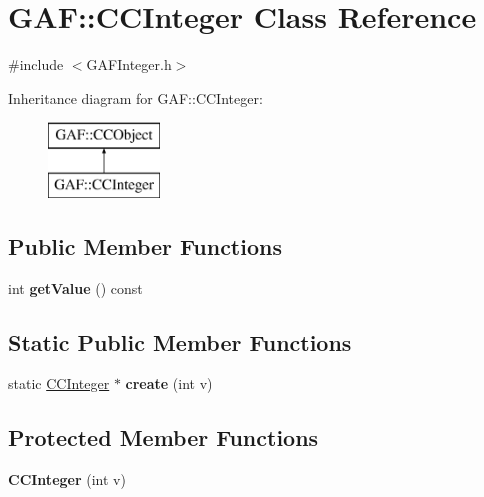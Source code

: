 \hypertarget{class_g_a_f_1_1_c_c_integer}{\section{G\-A\-F\-:\-:C\-C\-Integer Class Reference}
\label{class_g_a_f_1_1_c_c_integer}
}


{\ttfamily \#include $<$G\-A\-F\-Integer.\-h$>$}

Inheritance diagram for G\-A\-F\-:\-:C\-C\-Integer\-:\begin{figure}[H]
\begin{center}
\leavevmode
\includegraphics[height=2.000000cm]{class_g_a_f_1_1_c_c_integer}
\end{center}
\end{figure}
\subsection*{Public Member Functions}
\begin{DoxyCompactItemize}
\item 
\hypertarget{class_g_a_f_1_1_c_c_integer_a2793183f4108e22c85304580de6afef5}{int {\bfseries get\-Value} () const }\label{class_g_a_f_1_1_c_c_integer_a2793183f4108e22c85304580de6afef5}

\end{DoxyCompactItemize}
\subsection*{Static Public Member Functions}
\begin{DoxyCompactItemize}
\item 
\hypertarget{class_g_a_f_1_1_c_c_integer_ac058cd074ca1775881517852062ac76c}{static \hyperlink{class_g_a_f_1_1_c_c_integer}{C\-C\-Integer} $\ast$ {\bfseries create} (int v)}\label{class_g_a_f_1_1_c_c_integer_ac058cd074ca1775881517852062ac76c}

\end{DoxyCompactItemize}
\subsection*{Protected Member Functions}
\begin{DoxyCompactItemize}
\item 
\hypertarget{class_g_a_f_1_1_c_c_integer_a76cb2dc5a038b0fd847748b87cb53608}{{\bfseries C\-C\-Integer} (int v)}\label{class_g_a_f_1_1_c_c_integer_a76cb2dc5a038b0fd847748b87cb53608}

\end{DoxyCompactItemize}


